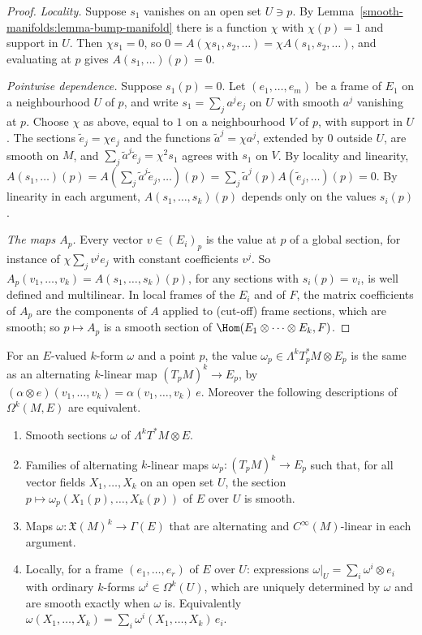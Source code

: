 \begin{proof}
\emph{Locality.} Suppose $s_1$ vanishes on an open set $U \ni p$. By Lemma~\ref{smooth-manifolds:lemma-bump-manifold} there is a function $\chi$ with $\chi(p) = 1$ and support
in $U$. Then $\chi s_1 = 0$, so $0 = A(\chi s_1, s_2, \ldots) = \chi A(s_1, s_2, \ldots)$, and evaluating at $p$ gives $A(s_1, \ldots)(p) = 0$.

\emph{Pointwise dependence.} Suppose $s_1(p) = 0$. Let $(e_1, \ldots, e_m)$ be a frame of $E_1$ on a neighbourhood $U$ of $p$, and write $s_1 = \sum_ja^je_j$ on $U$ with smooth
$a^j$ vanishing at $p$. Choose $\chi$ as above, equal to $1$ on a neighbourhood $V$ of $p$, with support in $U$. The sections $\tilde e_j = \chi e_j$ and the functions
$\tilde a^j = \chi a^j$, extended by $0$ outside $U$, are smooth on $M$, and $\sum_j\tilde a^j\tilde e_j = \chi^2s_1$ agrees with $s_1$ on $V$. By locality and linearity,
$A(s_1, \ldots)(p) = A(\sum_j\tilde a^j\tilde e_j, \ldots)(p) = \sum_j\tilde a^j(p)A(\tilde e_j, \ldots)(p) = 0$. By linearity in each argument, $A(s_1, \ldots, s_k)(p)$ depends only
on the values $s_i(p)$.

\emph{The maps $A_p$.} Every vector $v \in (E_i)_p$ is the value at $p$ of a global section, for instance of $\chi\sum_jv^je_j$ with constant coefficients $v^j$. So
$A_p(v_1, \ldots, v_k) = A(s_1, \ldots, s_k)(p)$, for any sections with $s_i(p) = v_i$, is well defined and multilinear. In local frames of the $E_i$ and of $F$, the matrix
coefficients of $A_p$ are the components of $A$ applied to (cut-off) frame sections, which are smooth; so $p \mapsto A_p$ is a smooth section of
$\Hom(E_1 \otimes \cdots \otimes E_k, F)$.
\end{proof}

\begin{proposition}\label{connections:proposition-bundle-valued-forms}
For an $E$-valued $k$-form $\omega$ and a point $p$, the value $\omega_p \in \Lambda^kT_p^*M \otimes E_p$ is the same as an alternating $k$-linear map $(T_pM)^k \to E_p$, by
$(\alpha \otimes e)(v_1, \ldots, v_k) = \alpha(v_1, \ldots, v_k)\,e$. Moreover the following descriptions of $\Omega^k(M, E)$ are equivalent.
\begin{enumerate}
\item Smooth sections $\omega$ of $\Lambda^kT^*M \otimes E$.
\item Families of alternating $k$-linear maps $\omega_p \colon (T_pM)^k \to E_p$ such that, for all vector fields $X_1, \ldots, X_k$ on an open set $U$, the section
$p \mapsto \omega_p(X_1(p), \ldots, X_k(p))$ of $E$ over $U$ is smooth.
\item Maps $\omega \colon \mathfrak{X}(M)^k \to \Gamma(E)$ that are alternating and $C^\infty(M)$-linear in each argument.
\item Locally, for a frame $(e_1, \ldots, e_r)$ of $E$ over $U$: expressions $\omega|_U = \sum_i\omega^i \otimes e_i$ with ordinary $k$-forms $\omega^i \in \Omega^k(U)$, which
are uniquely determined by $\omega$ and are smooth exactly when $\omega$ is. Equivalently $\omega(X_1, \ldots, X_k) = \sum_i\omega^i(X_1, \ldots, X_k)\,e_i$.
\end{enumerate}
\end{proposition}


